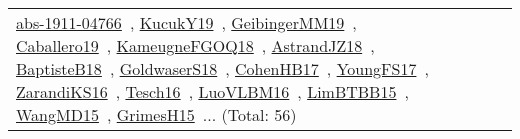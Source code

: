 {\begin{longtable}{lp{3cm}>{\raggedright\arraybackslash}p{6cm}>{\raggedright\arraybackslash}p{6cm}>{\raggedright\arraybackslash}p{8cm}}
\href{works/abs-1911-04766.pdf}{abs-1911-04766}~\cite{abs-1911-04766}, \href{works/KucukY19.pdf}{KucukY19}~\cite{KucukY19}, \href{works/GeibingerMM19.pdf}{GeibingerMM19}~\cite{GeibingerMM19}, \href{works/Caballero19.pdf}{Caballero19}~\cite{Caballero19}, \href{works/KameugneFGOQ18.pdf}{KameugneFGOQ18}~\cite{KameugneFGOQ18}, \href{works/AstrandJZ18.pdf}{AstrandJZ18}~\cite{AstrandJZ18}, \href{works/BaptisteB18.pdf}{BaptisteB18}~\cite{BaptisteB18}, \href{works/GoldwaserS18.pdf}{GoldwaserS18}~\cite{GoldwaserS18}, \href{works/CohenHB17.pdf}{CohenHB17}~\cite{CohenHB17}, \href{works/YoungFS17.pdf}{YoungFS17}~\cite{YoungFS17}, \href{works/ZarandiKS16.pdf}{ZarandiKS16}~\cite{ZarandiKS16}, \href{works/Tesch16.pdf}{Tesch16}~\cite{Tesch16}, \href{works/LuoVLBM16.pdf}{LuoVLBM16}~\cite{LuoVLBM16}, \href{works/LimBTBB15.pdf}{LimBTBB15}~\cite{LimBTBB15}, \href{works/WangMD15.pdf}{WangMD15}~\cite{WangMD15}, \href{works/GrimesH15.pdf}{GrimesH15}~\cite{GrimesH15}... (Total: 56)\\
\end{longtable}
}

